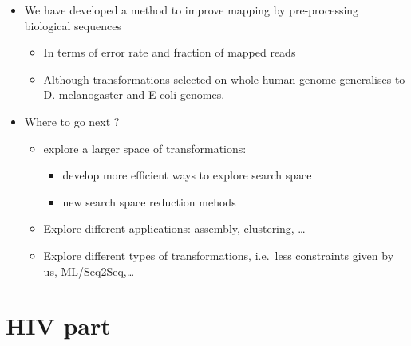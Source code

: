 \documentclass[
  11pt,
  twoside,
  BCOR=10mm,
  listof=totoc]{scrbook}
\begin{document}
\begin{itemize}
\item
  We have developed a method to improve mapping by pre-processing biological sequences

  \begin{itemize}
  \item
    In terms of error rate and fraction of mapped reads
  \item
    Although transformations selected on whole human genome generalises to D. melanogaster and E coli genomes.
  \end{itemize}
\item
  Where to go next ?

  \begin{itemize}
  \item
    explore a larger space of transformations:

    \begin{itemize}
    \item
      develop more efficient ways to explore search space
    \item
      new search space reduction mehods
    \end{itemize}
  \item
    Explore different applications: assembly, clustering, \ldots{}
  \item
    Explore different types of transformations, i.e.~less constraints given by us, ML/Seq2Seq,\ldots{}
  \end{itemize}
\end{itemize}

\hypertarget{hiv-part}{%
\section*{HIV part}\label{hiv-part}}
\end{document}
